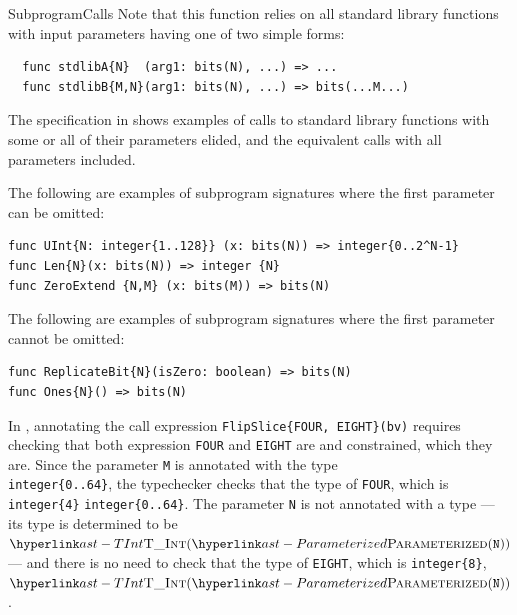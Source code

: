 \begin{TypingRuleList}{SubprogramCalls}
Note that this function relies on all standard library functions with input parameters having one of two simple forms:
\begin{lstlisting}
  func stdlibA{N}  (arg1: bits(N), ...) => ...
  func stdlibB{M,N}(arg1: bits(N), ...) => bits(...M...)
\end{lstlisting}

The specification in 
shows examples of calls to standard library functions with some or all of their
parameters elided, and the equivalent calls with all parameters included.




The following are examples of subprogram signatures
where the first parameter can be omitted:
\begin{lstlisting}
func UInt{N: integer{1..128}} (x: bits(N)) => integer{0..2^N-1}
func Len{N}(x: bits(N)) => integer {N}
func ZeroExtend {N,M} (x: bits(M)) => bits(N)
\end{lstlisting}

The following are examples of subprogram signatures
where the first parameter cannot be omitted:
\begin{lstlisting}
func ReplicateBit{N}(isZero: boolean) => bits(N)
func Ones{N}() => bits(N)
\end{lstlisting}



In ,
annotating the call expression \verb|FlipSlice{FOUR, EIGHT}(bv)|
requires checking that both expression \verb|FOUR| and \verb|EIGHT| are \symbolicallyevaluableterm{}
and constrained, which they are.
Since the parameter \verb|M| is annotated with the type \\
\verb|integer{0..64}|,
the typechecker checks that the type of \verb|FOUR|, which is \verb|integer{4}| \typesatisfiesterm{}
\verb|integer{0..64}|.
The parameter \verb|N| is not annotated with a type --- its type is
determined to be \\
$\TInt(\Parameterized(\texttt{N}))$ --- and there is no need to check that
the type of \verb|EIGHT|, which is \verb|integer{8}|, \typesatisfiesterm{} $\TInt(\Parameterized(\texttt{N}))$.


\end{TypingRuleList}
